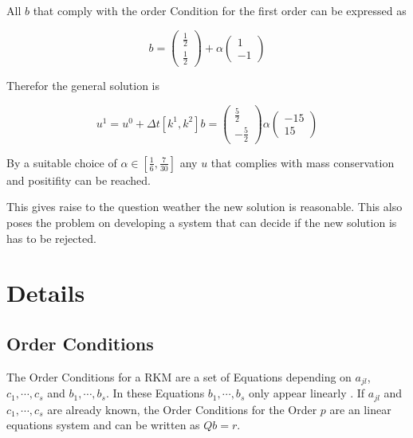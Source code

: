 \documentclass{article}
\begin{document}
All $b$ that comply with the order Condition for the first order can be expressed as

\begin{equation}
b= \left(\begin{matrix}\frac{1}{2}\\ \frac{1}{2}\end{matrix}\right) + \alpha \left(\begin{matrix}1\\ -1\end{matrix}\right)
\end{equation}

Therefor the general solution is 

\begin{equation}
u^{1} = u^0 + \Delta t  \left[k^1,k^2\right] b = \left(\begin{matrix}\frac{5}{2}\\- \frac{5}{2}\end{matrix}\right) \alpha  \left(\begin{matrix}-15\\15\end{matrix}\right)
\end{equation}

By a suitable choice of $\alpha \in [\frac{1}{6},\frac{7}{30}]$ any $u$ that complies with mass conservation and positifity can be reached. 

This gives raise to the question weather the new solution is reasonable.
This also poses the problem on developing a system that can decide if the new solution is has to be rejected. 




\section{Details}\label{sec:Deta	ils}



\subsection{Order Conditions}\label{sec:OrderCond}

The Order Conditions for a RKM are a set of Equations depending on $a_{jl}$, $c_1,\cdots,c_s$ and $b_1,\cdots,b_s$. In these Equations $b_1,\cdots,b_s$ only appear linearly \cite{hairer_runge-kutta_1993}.
If $a_{jl}$ and $c_1,\cdots,c_s$ are already known, the Order Conditions for the Order $p$ are an linear equations system and can be written as $Q b = r$. 
\end{document}
